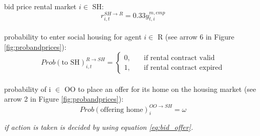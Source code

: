 \documentclass[]{article}
\begin{document}
bid price rental market $i \in$ SH:
\begin{equation} \label{eq:rent_bid}
	r^{SH \rightarrow R}_{i,t}= 0.33y^{m, emp}_{t,i}
\end{equation}
\\
probability to enter social housing for agent $i \in$ R (see arrow 6 in Figure \ref{fig:probandprices}):
\begin{equation}\label{eq:R_SH}
	Prob(\text{to SH})^{R\rightarrow SH}_{i,t}=
	\begin{cases}
	0, \quad&\text{if rental contract valid}\\
	1, \quad&\text{if rental contract expired}
	\end{cases}
\end{equation} 
\\
probability of i $\in$ OO to place an offer for its home on the housing market (see arrow 2 in Figure \ref{fig:probandprices}):
\begin{equation} \label{eq:sell_or_not}
Prob(\text{offering home})^{OO \rightarrow SH}_{i}  = \omega
\end{equation}
\begin{center}
	\textit{if action is taken is decided by using equation \eqref{eq:bid_offer}.}
	\\
\end{center}
\end{document}
